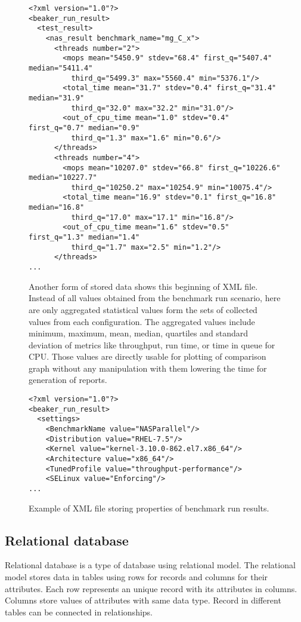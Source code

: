 \begin{figure}
  \small
  \begin{verbatim}
<?xml version="1.0"?>
<beaker_run_result>
  <test_result>
    <nas_result benchmark_name="mg_C_x">
      <threads number="2">
        <mops mean="5450.9" stdev="68.4" first_q="5407.4" median="5411.4"
          third_q="5499.3" max="5560.4" min="5376.1"/>
        <total_time mean="31.7" stdev="0.4" first_q="31.4" median="31.9"
          third_q="32.0" max="32.2" min="31.0"/>
        <out_of_cpu_time mean="1.0" stdev="0.4" first_q="0.7" median="0.9"
          third_q="1.3" max="1.6" min="0.6"/>
      </threads>
      <threads number="4">
        <mops mean="10207.0" stdev="66.8" first_q="10226.6" median="10227.7"
          third_q="10250.2" max="10254.9" min="10075.4"/>
        <total_time mean="16.9" stdev="0.1" first_q="16.8" median="16.8"
          third_q="17.0" max="17.1" min="16.8"/>
        <out_of_cpu_time mean="1.6" stdev="0.5" first_q="1.3" median="1.4"
          third_q="1.7" max="2.5" min="1.2"/>
      </threads>
...
\end{verbatim}
  \normalsize
  \caption{Another form of stored data shows this beginning of XML file. Instead
    of all values obtained from the benchmark run scenario, here are only
    aggregated statistical values form the sets of collected values from each
    configuration. The aggregated values include minimum, maximum, mean, median,
    quartiles and standard deviation of metrics like throughput, run time, or
    time in queue for CPU. Those values are directly usable for plotting of
    comparison graph without any manipulation with them lowering the time for
    generation of reports.}
  \label{fig:xml_sums}
\end{figure}

\begin{figure}
  \small
  \begin{verbatim}<?xml version="1.0"?>
<beaker_run_result>
  <settings>
    <BenchmarkName value="NASParallel"/>
    <Distribution value="RHEL-7.5"/>
    <Kernel value="kernel-3.10.0-862.el7.x86_64"/>
    <Architecture value="x86_64"/>
    <TunedProfile value="throughput-performance"/>
    <SELinux value="Enforcing"/>
...
\end{verbatim}
  \normalsize
  \caption{Example of XML file storing properties of benchmark run results.}
  \label{fig:xml_config}
\end{figure}

\subsection{Relational database}
Relational database is a type of database using relational model. The relational
model stores data in tables using rows for records and columns for their
attributes. Each row represents an unique record with its attributes in columns.
Columns store values of attributes with same data type. Record in different
tables can be connected in relationships.

